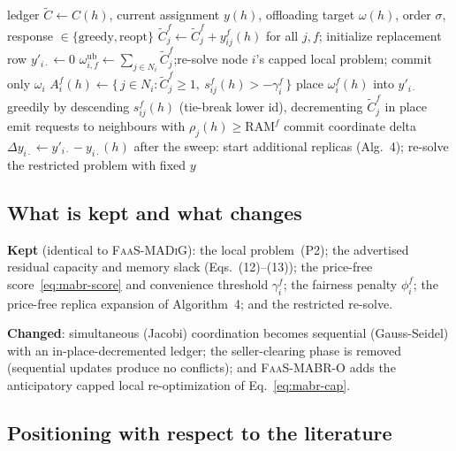 \begin{algorithm}
\caption{\textsc{FaaS-MABR} --- one sequential best-response sweep}
\label{alg:mabr-sweep}
\begin{algorithmic}[1]
\Require ledger $\tilde C\gets C(h)$, current assignment $y(h)$, offloading target $\omega(h)$, order $\sigma$, response $\in\{\text{greedy},\text{reopt}\}$
  \State $\tilde C_j^f\gets\tilde C_j^f+y_{ij}^f(h)$ for all $j,f$; initialize replacement row $y'_{i\cdot}\gets0$
    \State $\omega^{\mathrm{ub}}_{i,f}\gets\sum_{j\in N_i}\tilde C_j^f$;\quad re-solve node $i$'s capped local problem; commit only $\omega_i$
  \EndIf
    \State $A_i^f(h)\gets\{\,j\in N_i:\tilde C_j^f\ge1,\ s_{ij}^f(h)>-\gamma_i^f\,\}$
    \State place $\omega_i^f(h)$ into $y'_{i\cdot}$ greedily by descending $s_{ij}^f(h)$ (tie-break lower id), decrementing $\tilde C_j^f$ in place
     emit requests to neighbours with $\rho_j(h)\ge\mathrm{RAM}^f$ \EndIf
  \EndFor
  \State commit coordinate delta $\Delta y_{i\cdot}\gets y'_{i\cdot}-y_{i\cdot}(h)$
\EndFor
\State after the sweep: start additional replicas (Alg.~4); re-solve the restricted problem with fixed $y$
\end{algorithmic}
\end{algorithm}

\subsection{What is kept and what changes}
\label{sec:mabr-ablation}

\noindent\textbf{Kept} (identical to \textsc{FaaS-MADiG}): the local
problem~(P2); the advertised residual capacity and memory slack
(Eqs.~(12)--(13)); the price-free score~\eqref{eq:mabr-score} and convenience
threshold $\gamma_i^f$; the fairness penalty $\phi_i^f$; the price-free replica
expansion of Algorithm~4; and the restricted re-solve.

\noindent\textbf{Changed}: simultaneous (Jacobi) coordination becomes sequential
(Gauss-Seidel) with an in-place-decremented ledger; the seller-clearing phase is
removed (sequential updates produce no conflicts); and \textsc{FaaS-MABR-O} adds
the anticipatory capped local re-optimization of Eq.~\eqref{eq:mabr-cap}.

\subsection{Positioning with respect to the literature}
\label{sec:mabr-related}

